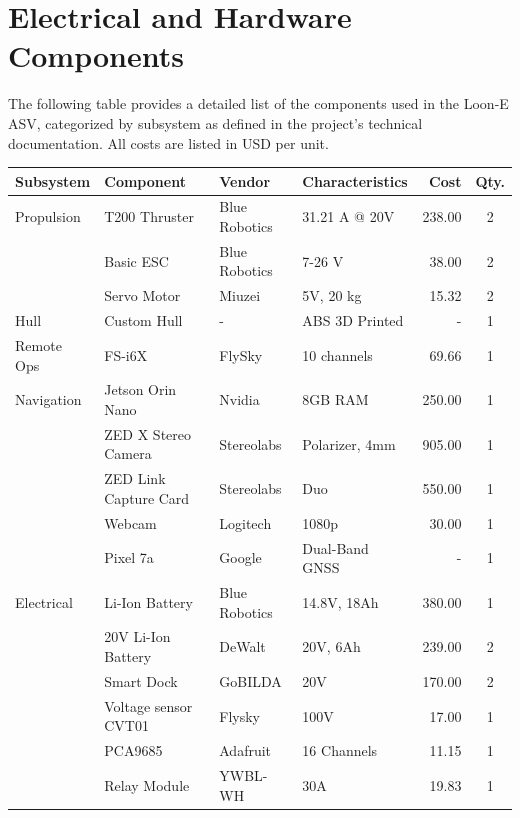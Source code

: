 \section{Electrical and Hardware Components}
\label{sec:hardware-components}

The following table provides a detailed list of the components used in the Loon-E ASV, categorized by subsystem as defined in the project's technical documentation. All costs are listed in USD per unit.

\begin{table}[H]
    \centering
    \small
    \begin{tabular}{|l|l|l|p{3cm}|r|c|}
        \hline
        \textbf{Subsystem} & \textbf{Component} & \textbf{Vendor} & \textbf{Characteristics} & \textbf{Cost} & \textbf{Qty.} \\
        \hline
        \hline
        Propulsion & T200 Thruster & Blue Robotics & 31.21 A @ 20V & 238.00 & 2 \\
        & Basic ESC & Blue Robotics & 7-26 V & 38.00 & 2 \\
        & Servo Motor & Miuzei & 5V, 20 kg & 15.32 & 2 \\
        \hline
        Hull & Custom Hull & - & ABS 3D Printed & - & 1 \\
        \hline
        Remote Ops & FS-i6X & FlySky & 10 channels & 69.66 & 1 \\
        \hline
        Navigation & Jetson Orin Nano & Nvidia & 8GB RAM & 250.00 & 1 \\
        & ZED X Stereo Camera & Stereolabs & Polarizer, 4mm & 905.00 & 1 \\
        & ZED Link Capture Card & Stereolabs & Duo & 550.00 & 1 \\
        & Webcam & Logitech & 1080p & 30.00 & 1 \\
        & Pixel 7a & Google & Dual-Band GNSS & - & 1 \\
        \hline
        Electrical & Li-Ion Battery & Blue Robotics & 14.8V, 18Ah & 380.00 & 1 \\
        & 20V Li-Ion Battery & DeWalt & 20V, 6Ah & 239.00 & 2 \\
        & Smart Dock & GoBILDA & 20V & 170.00 & 2 \\
        & Voltage sensor CVT01 & Flysky & 100V & 17.00 & 1 \\
        & PCA9685 & Adafruit & 16 Channels & 11.15 & 1 \\
        & Relay Module & YWBL-WH & 30A & 19.83 & 1 \\

\end{tabular}
\end{table}
